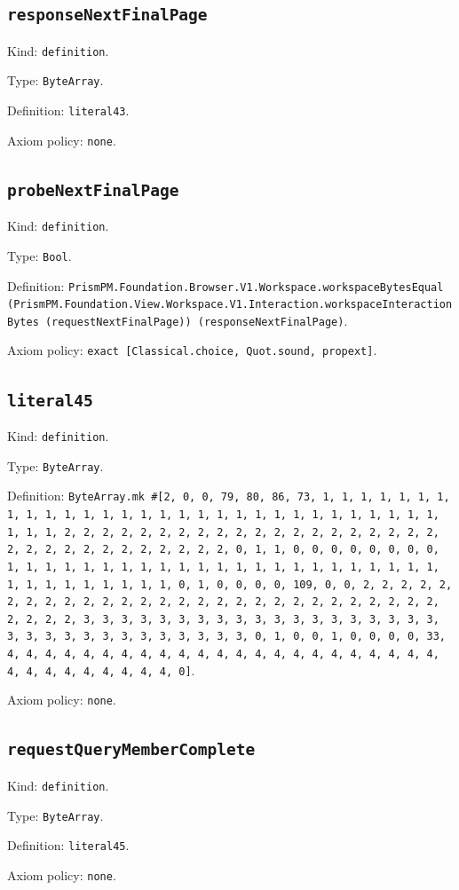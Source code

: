 \documentclass[11pt]{article}
\begin{document}
\subsection*{\texttt{responseNextFinalPage}}
\noindent Kind: \texttt{definition}.\par
\noindent Type: \texttt{ByteArray}.\par
\noindent Definition: \texttt{literal43}.\par
\noindent Axiom policy: \texttt{none}.\par
\subsection*{\texttt{probeNextFinalPage}}
\noindent Kind: \texttt{definition}.\par
\noindent Type: \texttt{Bool}.\par
\noindent Definition: \texttt{PrismPM.Foundation.Browser.V1.Workspace.workspaceBytesEqual (PrismPM.Foundation.View.Workspace.V1.Interaction.workspaceInteractionBytes (requestNextFinalPage)) (responseNextFinalPage)}.\par
\noindent Axiom policy: \texttt{exact [Classical.choice, Quot.sound, propext]}.\par
\subsection*{\texttt{literal45}}
\noindent Kind: \texttt{definition}.\par
\noindent Type: \texttt{ByteArray}.\par
\noindent Definition: \texttt{ByteArray.mk \#[2, 0, 0, 79, 80, 86, 73, 1, 1, 1, 1, 1, 1, 1, 1, 1, 1, 1, 1, 1, 1, 1, 1, 1, 1, 1, 1, 1, 1, 1, 1, 1, 1, 1, 1, 1, 1, 1, 1, 1, 2, 2, 2, 2, 2, 2, 2, 2, 2, 2, 2, 2, 2, 2, 2, 2, 2, 2, 2, 2, 2, 2, 2, 2, 2, 2, 2, 2, 2, 2, 2, 2, 0, 1, 1, 0, 0, 0, 0, 0, 0, 0, 0, 1, 1, 1, 1, 1, 1, 1, 1, 1, 1, 1, 1, 1, 1, 1, 1, 1, 1, 1, 1, 1, 1, 1, 1, 1, 1, 1, 1, 1, 1, 1, 1, 0, 1, 0, 0, 0, 0, 109, 0, 0, 2, 2, 2, 2, 2, 2, 2, 2, 2, 2, 2, 2, 2, 2, 2, 2, 2, 2, 2, 2, 2, 2, 2, 2, 2, 2, 2, 2, 2, 2, 2, 2, 3, 3, 3, 3, 3, 3, 3, 3, 3, 3, 3, 3, 3, 3, 3, 3, 3, 3, 3, 3, 3, 3, 3, 3, 3, 3, 3, 3, 3, 3, 3, 3, 0, 1, 0, 0, 1, 0, 0, 0, 0, 33, 4, 4, 4, 4, 4, 4, 4, 4, 4, 4, 4, 4, 4, 4, 4, 4, 4, 4, 4, 4, 4, 4, 4, 4, 4, 4, 4, 4, 4, 4, 4, 4, 0]}.\par
\noindent Axiom policy: \texttt{none}.\par
\subsection*{\texttt{requestQueryMemberComplete}}
\noindent Kind: \texttt{definition}.\par
\noindent Type: \texttt{ByteArray}.\par
\noindent Definition: \texttt{literal45}.\par
\noindent Axiom policy: \texttt{none}.\par
\end{document}
